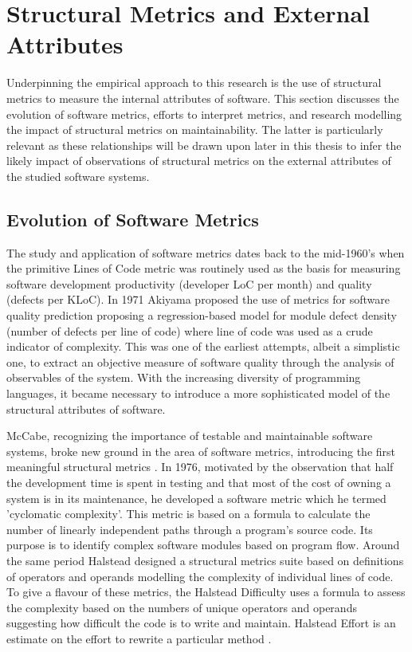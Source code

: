 \section{Structural Metrics and External Attributes} %
Underpinning the empirical approach to this research is the use of structural metrics to measure the internal attributes of software. This section discusses the evolution of software metrics, efforts to interpret metrics, and research modelling the impact of structural metrics on maintainability. The latter is particularly relevant as these relationships will be drawn upon later in this thesis to infer the likely impact of observations of structural metrics on the external attributes of the studied software systems.

\subsection{Evolution of Software Metrics}
The study and application of software metrics dates back to the mid-1960's when the primitive Lines of Code metric was routinely used as the basis for measuring software development productivity (developer LoC per month) and quality (defects per KLoC). In 1971 Akiyama \citep{akiyama1971example} proposed the use of metrics for software quality prediction proposing a regression-based model for module defect density (number of defects per line of code) where line of code was used as a crude indicator of complexity. This was one of the earliest attempts, albeit a simplistic one, to extract an objective measure of software quality through the analysis of observables of the system. With the increasing diversity of programming languages, it became necessary to introduce a more sophisticated model of the structural attributes of software. 

McCabe, recognizing the importance of testable and maintainable software systems, broke new ground in the area of software metrics, introducing the first meaningful structural metrics \citep{mccabe1976complexity}. In 1976, motivated by the observation that half the development time is spent in testing and that most of the cost of owning a system is in its maintenance, he developed a software metric which he termed 'cyclomatic complexity'. This metric is based on a formula to calculate the number of linearly independent paths through a program's source code. Its purpose is to identify complex software modules based on program flow. Around the same period Halstead designed a structural metrics suite based on definitions of operators and operands modelling the complexity of individual lines of code. To give a flavour of these metrics, the Halstead Difficulty uses a formula to assess the complexity based on the numbers of unique operators and operands suggesting how difficult the code is to write and maintain. Halstead Effort is an estimate on the effort to rewrite a particular method \citep{halstead1977elements}.

